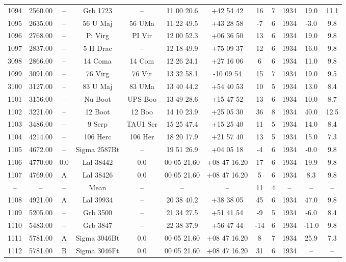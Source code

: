 \begin{table}
\begin{tabular}{cccccccccccc}
1094 & 2560.00 & -- & Grb 1723 & -- & 11 00 20.6 & +42 54 42 & 16 & 7 & 1934 & 19.0 & 11.1 \\
1095 & 2635.00 & -- & 56 U Maj & 56 UMa & 11 22 49.5 & +43 28 58 & -7 & 6 & 1934 & -3.0 & 9.8 \\
1096 & 2768.00 & -- & Pi Virg & PI Vir & 12 00 52.3 & +06 36 50 & 13 & 6 & 1934 & 19.0 & 9.8 \\
1097 & 2837.00 & -- & 5 H Drac & -- & 12 18 49.9 & +75 09 37 & 12 & 6 & 1934 & 16.0 & 9.8 \\
3098 & 2866.00 & -- & 14 Coma & 14 Com & 12 26 24.1 & +27 16 06 & 6 & 6 & 1934 & 11.0 & 9.8 \\
1099 & 3091.00 & -- & 76 Virg & 76 Vir & 13 32 58.1 & -10 09 54 & 15 & 7 & 1934 & 19.0 & 9.5 \\
3100 & 3127.00 & -- & 83 U Maj & 83 UMa & 13 40 44.2 & +54 40 53 & 10 & 5 & 1934 & 13.0 & 8.4 \\
1101 & 3156.00 & -- & Nu Boot & UPS Boo & 13 49 28.6 & +15 47 52 & 13 & 6 & 1934 & 10.0 & 8.7 \\
1102 & 3221.00 & -- & 12 Boot & 12 Boo & 14 10 23.9 & +25 05 30 & 36 & 8 & 1934 & 40.0 & 12.5 \\
1103 & 3486.00 & -- & 9 Serp & TAU1 Ser & 15 25 47.4 & +15 25 40 & 11 & 5 & 1934 & 14.0 & 8.4 \\
1104 & 4214.00 & -- & 106 Herc & 106 Her & 18 20 17.9 & +21 57 40 & 13 & 5 & 1934 & 15.0 & 7.3 \\
1105 & 4672.00 & -- & Sigma 2587Bt & -- & 19 51 26.9 & +04 05 18 & -4 & 6 & 1934 & -0.0 & 9.8 \\
1106 & 4770.00 & 0.0 & Lal 38442 & 0.0 & 00 05 21.60 & +08 47 16.20 & 17 & 6 & 1934 & 19.9 & 9.8 \\
1107 & 4769.00 & A & Lal 38426 & 0.0 & 00 05 21.60 & +08 47 16.20 & 5 & 6 & 1934 & 8.3 & 9.8 \\
-- & -- & -- & Mean & -- & -- & -- & 11 & 4 & -- & -- & -- \\
1108 & 4921.00 & A & Lal 39934 & -- & 20 38 40.2 & +38 38 05 & 45 & 6 & 1934 & 47.0 & 9.8 \\
1109 & 5205.00 & -- & Grb 3500 & -- & 21 34 27.5 & +51 41 54 & -9 & 5 & 1934 & -6.0 & 8.4 \\
1110 & 5483.00 & -- & Grb 3847 & -- & 22 38 37.9 & +56 47 44 & -14 & 6 & 1934 & -11.0 & 9.8 \\
1111 & 5781.00 & A & Sigma 3046Bt & 0.0 & 00 05 21.60 & +08 47 16.20 & 8 & 7 & 1934 & 25.9 & 7.3 \\
1112 & 5781.00 & B & Sigma 3046Ft & 0.0 & 00 05 21.60 & +08 47 16.20 & 31 & 6 & 1934 & -- & -- \\

\end{tabular}
\end{table}
